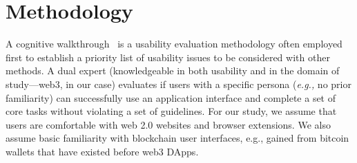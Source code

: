 \documentclass[conference]{IEEEtran}
\begin{document}









\section{Methodology}
\label{sec:method}

A cognitive walkthrough~\cite{wharton1994cognitive} is a usability evaluation methodology often employed first to establish a priority list of usability issues to be considered with other methods. A dual expert (knowledgeable in both usability and in the domain of study---web3, in our case) evaluates if users with a specific persona (\textit{e.g.,} no prior familiarity) can successfully use an application interface and complete a set of core tasks without violating a set of guidelines.
For our study, we assume that users are comfortable with web 2.0 websites and browser extensions.
We also assume basic familiarity with blockchain user interfaces, e.g., gained from bitcoin wallets that have existed before web3 DApps.
\end{document}
